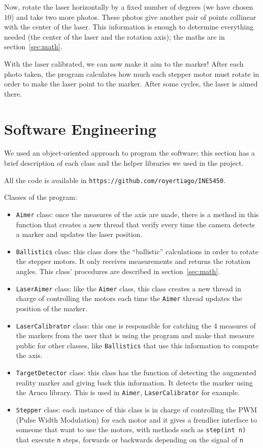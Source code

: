 \documentclass{article}
\newcommand\class[1]{\texttt{#1}}
\newcommand\method[1]{\texttt{#1}}
\begin{document}
Now, rotate the laser horizontally by a fixed number of degrees
(we have chosen $10$)
and take two more photos.
These photos give another pair of points collinear with the center of the laser.
This information is enough to determine everything needed
(the center of the laser and the rotation axis);
the maths are in section~\ref{sec:math}.

With the laser calibrated,
we can now make it aim to the marker!
After each photo taken,
the program calculates how much each stepper motor must rotate
in order to make the laser point to the marker.
After some cycles,
the laser is aimed there.

\section{Software Engineering}

We used an object-oriented approach to program the software;
this section has a brief description of each class
and the helper libraries we used in the project.

All the code is available in \verb"https://github.com/royertiago/INE5450".

Classes of the program:
\begin{itemize}
    \item \class{Aimer} class: once the measures of the axis are made,
        there is a method in this function that creates a new thread that verify
        every time the camera detects a marker and updates the laser position.
    \item \class{Ballistics} class: this class does the ``ballistic'' calculations
        in order to rotate the stepper motors. It only receives measurements
        and returns the rotation angles.
        This class' procedures are described in section~\ref{sec:math}.
    \item \class{LaserAimer} class: like the \class{Aimer} class, this class
        creates a new thread in charge of controlling the motors each time the
        \class{Aimer} thread updates the position of the marker.
    \item \class{LaserCalibrator} class: this one is responsible for catching
        the 4 measures of the markers from the user that is using the program and make
        that measure public for other classes, like \class{Ballistics} that use this
        information to compute the axis.
    \item \class{TargetDetector} class: this class has the function of
        detecting the augmented reality marker and giving back this information.
        It detects the marker using the Aruco library.
        This is used in \class{Aimer}, \class{LaserCalibrator} for example.
    \item \class{Stepper} class: each instance of this class is in charge of
        controlling the PWM (Pulse Width Modulation) for each motor and it
        gives a frendlier interface to someone that want to use the motors,
        with methods such as \method{step(int n)} that execute \texttt{n} steps,
        forwards or backwards depending on the signal of \texttt{n}
\end{itemize}
\end{document}
